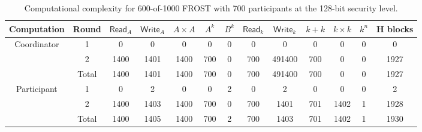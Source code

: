 \begin{table}
	\centering
	\begin{tabular}{c c c c c c c c c c c c c}
		\toprule
		Computation & Round & $\mathsf{Read}_A$ & $\mathsf{Write}_A$ & $A \times A$ & $A^k$  & $B^k$  & $\mathsf{Read}_k$ & $\mathsf{Write}_k$ & $k + k$ & $k \times k$ & $k^n$ & H blocks \\ \midrule
		Coordinator & 1 & 0 & 0 & 0 & 0 & 0 & 0 & 0 & 0 & 0 & 0 & 0 \\
		            & 2 & 1400 & 1401 & 1400 & 700 & 0 & 700 & 491400 & 700 & 0 & 0 & 1927 \\
		            & Total & 1400 & 1401 & 1400 & 700 & 0 & 700 & 491400 & 700 & 0 & 0 & 1927 \\
		\midrule
		Participant & 1 & 0 & 2 & 0 & 0 & 2 & 0 & 2 & 0 & 0 & 0 & 2 \\
		            & 2 & 1400 & 1403 & 1400 & 700 & 0 & 700 & 1401 & 701 & 1402 & 1 & 1928 \\
		            & Total & 1400 & 1405 & 1400 & 700 & 2 & 700 & 1403 & 701 & 1402 & 1 & 1930 \\
		\bottomrule
	\end{tabular}
	\caption{Computational complexity for 600-of-1000 FROST with 700 participants at the 128-bit security level.}
\end{table}

